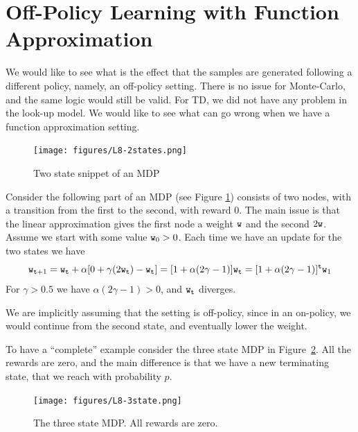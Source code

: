 \section{Off-Policy Learning with Function Approximation}
\label{sec:off_policy_FA}

We would like to see what is the effect that the samples are generated
following a different policy, namely, an off-policy setting. There
is no issue for Monte-Carlo, and the same logic would still be
valid.  For TD, we did not have any problem in the look-up model. We
would like to see what can go wrong when we have a function
approximation setting.


\begin{figure}
  \begin{centering}
  \texttt{[image: figures/L8-2states.png]}\\
  \caption{Two state snippet of an MDP }\label{fig:L8-2state}
  \end{centering}
\end{figure}

Consider the following part of an MDP (see Figure
\ref{fig:L8-2state}) consists of two nodes, with a transition from
the first to the second, with reward $0$. The main issue is that the
linear approximation gives the first node a weight ${\tt w}$ and the
second $2{\tt w}$. Assume we start with some value ${\tt w}_0>0$.
Each time we have an update for the two states we have
\[
{\tt w}_{{\tt t}+1}={\tt w}_{\tt t} +\alpha[0+\gamma
(2{\tt w}_{\tt t})-{\tt w}_{\tt t}]=[1+\alpha(2\gamma-1)]{\tt w}_{\tt t}=[1+\alpha(2\gamma-1)]^{\tt t}{\tt w}_1
\]
For $\gamma>0.5$ we have $\alpha(2\gamma-1)>0$, and ${\tt w}_{\tt t}$
diverges.

We are implicitly assuming that the setting is off-policy, since in
an on-policy, we would continue from the second state, and
eventually lower the weight.

To have a ``complete'' example consider the three state MDP in
Figure~\ref{fig:L8-3state}. All the rewards are zero, and the main
difference is that we have a new terminating state, that we reach
with probability $p$.

\begin{figure}
  \begin{centering}
  \texttt{[image: figures/L8-3state.png]}\\
  \caption{The three state MDP. All rewards are zero.}\label{fig:L8-3state}
  \end{centering}
\end{figure}




